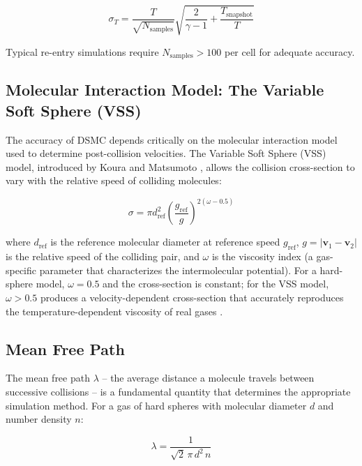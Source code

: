 \begin{equation}
    \sigma_T = \frac{T}{\sqrt{N_{\text{samples}}}} \sqrt{\frac{2}{\gamma - 1} + \frac{T_{\text{snapshot}}}{T}}
    \label{eq:dsmc_noise}
\end{equation}

\noindent Typical re-entry simulations require $N_{\text{samples}} > 100$ per cell for adequate accuracy.

\subsection{Molecular Interaction Model: The Variable Soft Sphere (VSS)}

The accuracy of DSMC depends critically on the molecular interaction model used to determine post-collision velocities. The Variable Soft Sphere (VSS) model, introduced by Koura and Matsumoto \cite{bird1994molecular}, allows the collision cross-section to vary with the relative speed of colliding molecules:

\begin{equation}
    \sigma = \pi d_{\text{ref}}^2 \left( \frac{g_{\text{ref}}}{g} \right)^{2(\omega - 0.5)}
    \label{eq:vss_cross_section}
\end{equation}

\noindent where $d_{\text{ref}}$ is the reference molecular diameter at reference speed $g_{\text{ref}}$, $g = |\mathbf{v}_1 - \mathbf{v}_2|$ is the relative speed of the colliding pair, and $\omega$ is the viscosity index (a gas-specific parameter that characterizes the intermolecular potential). For a hard-sphere model, $\omega = 0.5$ and the cross-section is constant; for the VSS model, $\omega > 0.5$ produces a velocity-dependent cross-section that accurately reproduces the temperature-dependent viscosity of real gases \cite{bird1994molecular}.

\subsection{Mean Free Path}

The mean free path $\lambda$ -- the average distance a molecule travels between successive collisions -- is a fundamental quantity that determines the appropriate simulation method. For a gas of hard spheres with molecular diameter $d$ and number density $n$:

\begin{equation}
    \lambda = \frac{1}{\sqrt{2} \, \pi \, d^2 \, n}
    \label{eq:mean_free_path}
\end{equation}

